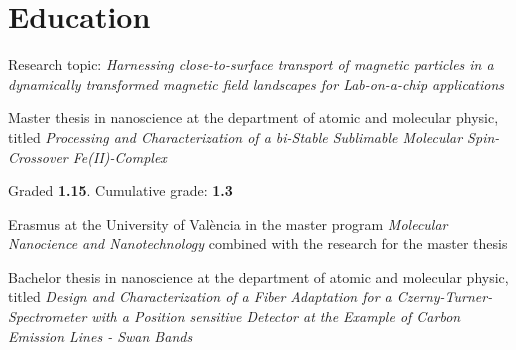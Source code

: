 \begin{minipage}[t]{0.70\textwidth} 



\section{Education}
\vspace{\topsep} %
\begin{tightemize}
\item Research topic: \textit{Harnessing close-to-surface transport of magnetic particles in a dynamically transformed magnetic field landscapes for Lab-on-a-chip applications}
\end{tightemize}

\sectionsep

\begin{tightemize}
\item Master thesis in nanoscience at the department of atomic and molecular physic, titled \textit{Processing and Characterization of a bi-Stable Sublimable Molecular Spin-Crossover Fe(II)-Complex} 


Graded \textbf{1.15}. Cumulative grade: \textbf{1.3}
\end{tightemize}

\begin{tightemize}
\item Erasmus at the University of València in the master program \textit{Molecular Nanocience and Nanotechnology} combined with the research for the master thesis
\end{tightemize}

\sectionsep

\begin{tightemize}
\item Bachelor thesis in nanoscience at the department of atomic and molecular physic, titled \textit{Design and Characterization of a Fiber Adaptation for a Czerny-Turner-Spectrometer with a Position sensitive Detector at the Example of Carbon Emission Lines - Swan Bands}


\end{tightemize}
\end{minipage}
